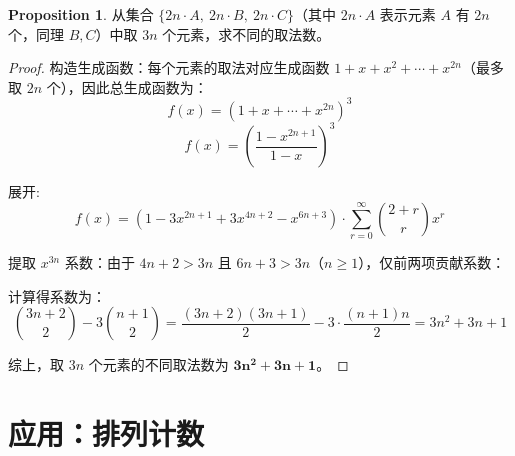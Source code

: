 \documentclass[oneside]{book}
\theoremstyle{definition}
\newtheorem{proposition}{Proposition}[section]
\begin{document}
\begin{proposition}
	从集合 \( \{ 2n \cdot A,\ 2n \cdot B,\ 2n \cdot C \} \)（其中 \( 2n \cdot A \) 表示元素 \( A \) 有 \( 2n \) 个，同理 \( B,C \)）中取 \( 3n \) 个元素，求不同的取法数。
\end{proposition}

\begin{proof}
构造生成函数：每个元素的取法对应生成函数 \( 1 + x + x^2 + \cdots + x^{2n} \)（最多取 \( 2n \) 个），因此总生成函数为：
	\[
	f(x) = \left(1 + x + \cdots + x^{2n}\right)^3
	\]
	\[
	f(x) = \left( \frac{1 - x^{2n+1}}{1 - x} \right)^3
	\]
	
	展开:\\
	\[
	f(x) = (1 - 3x^{2n+1} + 3x^{4n+2} - x^{6n+3}) \cdot \sum_{r=0}^{\infty} \binom{2 + r}{r} x^r
	\]
	
	提取 \( x^{3n} \) 系数：由于 \( 4n+2 > 3n \) 且 \( 6n+3 > 3n \)（\( n \geq 1 \)），仅前两项贡献系数：
	
	计算得系数为：
	\[
	\binom{3n + 2}{2} - 3 \binom{n + 1}{2} = \frac{(3n+2)(3n+1)}{2} - 3 \cdot \frac{(n+1)n}{2} = 3n^2 + 3n + 1
	\]
	
	综上，取 \( 3n \) 个元素的不同取法数为 \( \boldsymbol{3n^2 + 3n + 1} \)。
\end{proof}
\section{应用：排列计数}
\end{document}
